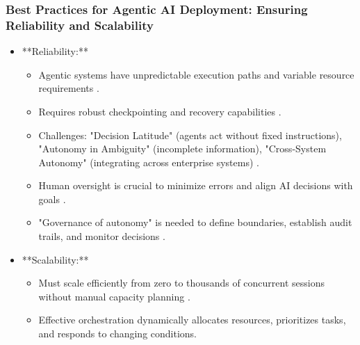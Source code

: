 \documentclass{beamer}       %
\begin{document}
\begin{frame}
    \frametitle{Best Practices for Agentic AI Deployment: Ensuring Reliability and Scalability}
    \begin{itemize}
        \item **Reliability:**
        \begin{itemize}
            \item Agentic systems have unpredictable execution paths and variable resource requirements .
            \item Requires robust checkpointing and recovery capabilities .
            \item Challenges: "Decision Latitude" (agents act without fixed instructions), "Autonomy in Ambiguity" (incomplete information), "Cross-System Autonomy" (integrating across enterprise systems) .
            \item Human oversight is crucial to minimize errors and align AI decisions with goals .
            \item "Governance of autonomy" is needed to define boundaries, establish audit trails, and monitor decisions .
        \end{itemize}
        \item **Scalability:**
        \begin{itemize}
            \item Must scale efficiently from zero to thousands of concurrent sessions without manual capacity planning .
            \item Effective orchestration dynamically allocates resources, prioritizes tasks, and responds to changing conditions.
        \end{itemize}
    \end{itemize}
\end{frame}
\end{document}
